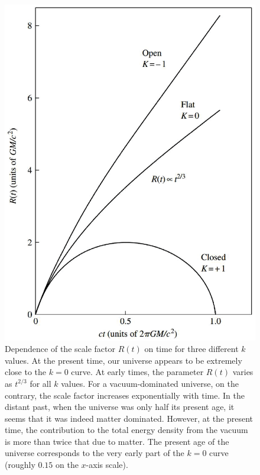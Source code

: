 \documentclass[12pt,a4paper]{article}
\begin{document}
\begin{figure}
\centering
\includegraphics[height=12.cm,angle=0]{scalefactor_evo.eps}
\caption{Dependence of the scale factor $R(t)$ on time for three different $k$ values. At the present time, our universe appears to be extremely close to the $k = 0$ curve. At early times, the parameter $R(t)$ varies as $t^{2/3}$
for all $k$ values. For a vacuum-dominated universe, on the contrary, the scale factor increases exponentially with
time. In the distant past, when the universe was only half its present age, it seems that it was indeed matter dominated. However, at the present time, the contribution to the total energy density from the vacuum is
more than twice that due to matter. The present age of the universe corresponds to the very early part of the $k = 0$
curve (roughly $0.15$ on the $x$-axis scale).} 
\label{fig:scalefactor}
\end{figure}
\end{document}
